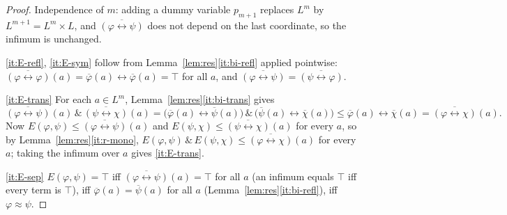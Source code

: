 \documentclass{amsart}
\theoremstyle{definition}
\theoremstyle{plain}
\newcommand{\fbi}{\leftrightarrow}
\newcommand{\odotop}{\,\&\,}
\newcommand{\Top}{\top}
\begin{document}
\begin{proof}
Independence of $m$: adding a dummy variable $p_{m+1}$ replaces $L^m$ by
$L^{m+1}=L^m\times L$, and $\overline{(\varphi\fbi\psi)}$ does not depend on the
last coordinate, so the infimum is unchanged.

\eqref{it:E-refl}, \eqref{it:E-sym} follow from
Lemma~\ref{lem:res}\eqref{it:bi-refl} applied pointwise:
$\overline{(\varphi\fbi\varphi)}(a)=\overline\varphi(a)\fbi\overline\varphi(a)=\Top$
for all $a$, and $\overline{(\varphi\fbi\psi)}=\overline{(\psi\fbi\varphi)}$.

\eqref{it:E-trans} For each $a\in L^m$,
Lemma~\ref{lem:res}\eqref{it:bi-trans} gives
\[
\overline{(\varphi\fbi\psi)}(a)\odotop\overline{(\psi\fbi\chi)}(a)
=\bigl(\overline\varphi(a)\fbi\overline\psi(a)\bigr)\odotop
\bigl(\overline\psi(a)\fbi\overline\chi(a)\bigr)
\le \overline\varphi(a)\fbi\overline\chi(a)
=\overline{(\varphi\fbi\chi)}(a).
\]
Now $E(\varphi,\psi)\le\overline{(\varphi\fbi\psi)}(a)$ and
$E(\psi,\chi)\le\overline{(\psi\fbi\chi)}(a)$ for every $a$, so by
Lemma~\ref{lem:res}\eqref{it:r-mono},
$E(\varphi,\psi)\odotop E(\psi,\chi)\le\overline{(\varphi\fbi\chi)}(a)$ for every
$a$; taking the infimum over $a$ gives \eqref{it:E-trans}.

\eqref{it:E-sep} $E(\varphi,\psi)=\Top$ iff
$\overline{(\varphi\fbi\psi)}(a)=\Top$ for all $a$ (an infimum equals $\Top$ iff
every term is $\Top$), iff $\overline\varphi(a)=\overline\psi(a)$ for all $a$
(Lemma~\ref{lem:res}\eqref{it:bi-refl}), iff $\varphi\approx\psi$.


\end{proof}
\end{document}
